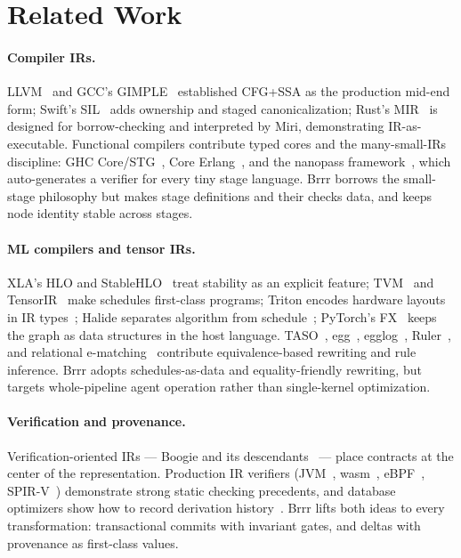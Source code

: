 \section{Related Work}
\label{sec:related}

\paragraph{Compiler IRs.} LLVM~\cite{lattner2004llvm} and GCC's
GIMPLE~\cite{merrill2003gimple} established CFG+SSA as the production mid-end form;
Swift's SIL~\cite{swiftsil} adds ownership and staged canonicalization; Rust's
MIR~\cite{mir} is designed for borrow-checking and interpreted by Miri, demonstrating
IR-as-executable. Functional compilers contribute typed cores and the many-small-IRs
discipline: GHC Core/STG~\cite{peytonjones1992stg}, Core Erlang~\cite{coreerlang}, and
the nanopass framework~\cite{keep2013nanopass}, which auto-generates a verifier for
every tiny stage language. Brrr borrows the small-stage philosophy but makes stage
definitions and their checks data, and keeps node identity stable across stages.

\paragraph{ML compilers and tensor IRs.} XLA's HLO and StableHLO~\cite{stablehlo}
treat stability as an explicit feature; TVM~\cite{chen2018tvm} and
TensorIR~\cite{zheng2023tensorir} make schedules first-class programs; Triton
encodes hardware layouts in IR types~\cite{tillet2019triton}; Halide separates
algorithm from schedule~\cite{ragankelley2013halide}; PyTorch's FX~\cite{pytorchfx}
keeps the graph as data structures in the host language. TASO~\cite{jia2019taso},
egg~\cite{willsey2021egg}, egglog~\cite{zhang2023better}, Ruler~\cite{nandi2021ruler},
and relational e-matching~\cite{zhang2022relational} contribute equivalence-based
rewriting and rule inference. Brrr adopts schedules-as-data and
equality-friendly rewriting, but targets whole-pipeline agent operation rather than
single-kernel optimization.

\paragraph{Verification and provenance.} Verification-oriented IRs — Boogie and its
descendants~\cite{barnett2005boogie} — place contracts at the center of the
representation. Production IR verifiers (JVM~\cite{jvmspec}, wasm~\cite{haas2017wasm},
eBPF~\cite{ebpf}, SPIR-V~\cite{spirvspec}) demonstrate strong static checking
precedents, and database optimizers show how to record derivation
history~\cite{graefe1995cascades}. Brrr lifts both ideas to every transformation:
transactional commits with invariant gates, and deltas with provenance as first-class
values.

